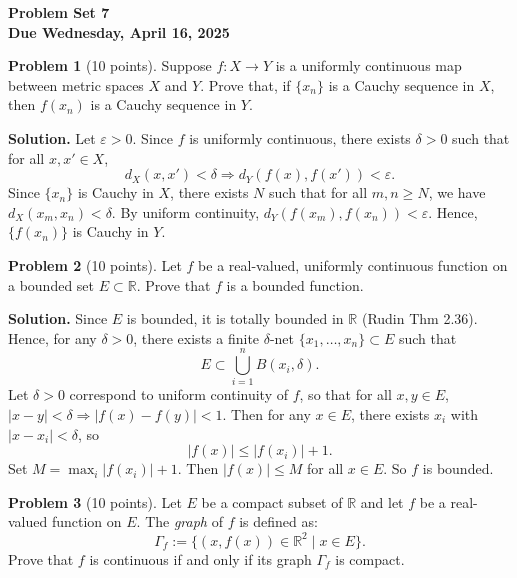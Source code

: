 \documentclass[12pt,oneside]{article}
\theoremstyle{definition}
\newtheorem{problem}{Problem}
\begin{document}
\pagestyle{fancy}

\begin{center}
\bf \Large
Problem Set 7 \\[0.5 em]
\large
Due Wednesday, April 16, 2025
\end{center}

\bigskip

\begin{problem}[10 points]
Suppose $f : X \rightarrow Y$ is a uniformly continuous map between metric spaces $X$ and $Y$. 
Prove that, if $\{x_n\}$ is a Cauchy sequence in $X$, then $f(x_n)$ is a Cauchy sequence in $Y$. 
\end{problem}

\textbf{Solution.} Let $\varepsilon > 0$. Since $f$ is uniformly continuous, there exists $\delta > 0$ such that for all $x, x' \in X$,
\[
d_X(x, x') < \delta \Rightarrow d_Y(f(x), f(x')) < \varepsilon.
\]
Since $\{x_n\}$ is Cauchy in $X$, there exists $N$ such that for all $m,n \geq N$, we have $d_X(x_m, x_n) < \delta$. By uniform continuity, $d_Y(f(x_m), f(x_n)) < \varepsilon$. Hence, $\{f(x_n)\}$ is Cauchy in $Y$.

\bigskip

\begin{problem}[10 points]
Let $f$ be a real-valued, uniformly continuous function on a bounded set $E \subset \mathbb{R}$. 
Prove that $f$ is a bounded function.
\end{problem}

\textbf{Solution.} Since $E$ is bounded, it is totally bounded in $\mathbb{R}$ (Rudin Thm 2.36). Hence, for any $\delta > 0$, there exists a finite $\delta$-net $\{x_1, \dots, x_n\} \subset E$ such that
\[
E \subset \bigcup_{i=1}^n B(x_i, \delta).
\]
Let $\delta > 0$ correspond to uniform continuity of $f$, so that for all $x, y \in E$, $|x - y| < \delta \Rightarrow |f(x) - f(y)| < 1$. Then for any $x \in E$, there exists $x_i$ with $|x - x_i| < \delta$, so
\[
|f(x)| \leq |f(x_i)| + 1.
\]
Set $M = \max_i |f(x_i)| + 1$. Then $|f(x)| \leq M$ for all $x \in E$. So $f$ is bounded.

\bigskip

\begin{problem}[10 points]
Let $E$ be a compact subset of $\mathbb{R}$ and let $f$ be a real-valued function on $E$. 
The \emph{graph} of $f$ is defined as:
\[
\Gamma_f := \{(x,f(x)) \in \mathbb{R}^2\;\vert\; x \in E\}.
\]
Prove that $f$ is continuous if and only if its graph $\Gamma_f$ is compact. 
\end{problem}
\end{document}
